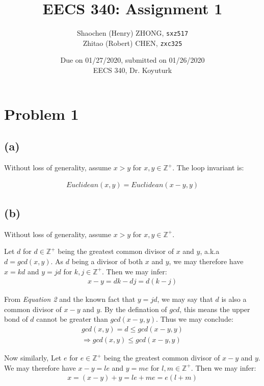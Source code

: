 \documentclass[12pt]{article}
\newcommand{\inlinecode}{\texttt}
\begin{document}
\title{\textbf{EECS 340: Assignment 1}}

\author{Shaochen (Henry) ZHONG, \inlinecode{sxz517} \\ Zhitao (Robert) CHEN, \inlinecode{zxc325}}
\date{Due on 01/27/2020, submitted on 01/26/2020 \\ EECS 340, Dr. Koyuturk}
\maketitle

\section{Problem 1}
\subsection{(a)}
Without loss of generality, assume $x > y$ for $x, y \in \mathbb{Z^+}$. The loop invariant is:

\begin{gather}
    Euclidean(x, y) = Euclidean(x - y, y)
\end{gather}

\subsection{(b)}
Without loss of generality, assume $x > y$ for $x, y \in \mathbb{Z^+}$.

Let $d$ for $d \in \mathbb{Z^+}$ being the greatest common divisor of $x$ and $y$, a.k.a $d = gcd(x, y)$. As $d$ being a divisor of both $x$ and $y$, we may therefore have $x = kd$ and $y = jd$ for $k, j \in \mathbb{Z^+}$. Then we may infer:
\begin{gather}
    x - y = dk - dj = d(k - j)
\end{gather}

From \textit{Equation 2} and the known fact that $y = jd$, we may say that $d$ is also a common divisor of $x - y$ and $y$. By the defination of $gcd$, this means the upper bond of $d$ cannot be greater than $gcd(x-y, y)$. Thus we may conclude:
\begin{gather}
    gcd(x, y) = d \leq gcd(x-y, y) \nonumber \\
    \Rightarrow gcd(x, y) \leq gcd(x-y, y)
\end{gather}

Now similarly, Let $e$ for $e \in \mathbb{Z^+}$ being the greatest common divisor of $x-y$ and $y$. We may therefore have $x - y = le$ and $y = me$ for $l, m \in \mathbb{Z^+}$. Then we may infer:
\begin{gather}
    x = (x - y) + y = le + me = e(l + m)
\end{gather}
\end{document}
